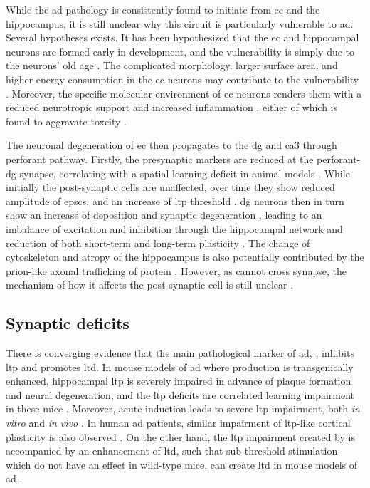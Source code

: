 While the \gls{ad} pathology is consistently found to initiate from \gls{ec} and the hippocampus, it is still unclear why this circuit is particularly vulnerable to \gls{ad}. Several hypotheses exists. It has been hypothesized that the \gls{ec} and hippocampal neurons are formed early in development, and the vulnerability is simply due to the neurons' old age \citep{rakic81}. The complicated morphology, larger surface area, and higher energy consumption in the \gls{ec} neurons may contribute to the vulnerability \citep{hevner92, buckmaster04}. Moreover, the specific molecular environment of \gls{ec} neurons renders them with a reduced neurotropic support \citep{narisawa-saito96, peterson96} and increased inflammation \citep{janelsins05, okun10}, either of which is found to aggravate \abeta{} toxcity \citep{tang08, stranahan10}.

The neuronal degeneration of \gls{ec} then propagates to the \gls{dg} and \gls{ca3} through perforant pathway. Firstly, the presynaptic markers are reduced at the perforant-\gls{dg} synapse, correlating with a spatial learning deficit in animal models \citep{smith00}. While initially the post-synaptic cells are unaffected, over time they show reduced amplitude of \glspl{epsc}, and an increase of \gls{ltp} threshold \citep{calhoun08, barnes80, barnes00}. \Gls{dg} neurons then in turn show an increase of \abeta{} deposition and synaptic degeneration \citep{reilly03, dong07}, leading to an imbalance of excitation and inhibition through the hippocampal network and reduction of both short-term and long-term plasticity \citep{palop07}. The change of cytoskeleton and atropy of the hippocampus is also potentially contributed by the prion-like axonal trafficking of \atau{} protein \citep{clavaguera09}. However, as \atau{} cannot cross synapse, the mechanism of how it affects the post-synaptic cell is still unclear \citep{stranahan10}.  

\subsection{Synaptic deficits \label{ad.synaptic}}

There is converging evidence that the main pathological marker of \gls{ad}, \abeta{}, inhibits \gls{ltp} and promotes \gls{ltd}. In mouse models of \gls{ad} where \abeta{} production is transgenically enhanced, hippocampal \gls{ltp} is severely impaired in advance of plaque formation and neural degeneration, and the \gls{ltp} deficits are correlated learning impairment in these mice \citep{hsia99, chapman99, roberson11}. Moreover, acute \abeta{} induction leads to severe \gls{ltp} impairment, both \textit{in vitro} \citep{lambert98, shankar08} and \textit{in vivo} \citep{walsh02, hu08}. In human \gls{ad} patients, similar impairment of \gls{ltp}-like cortical plasticity is also observed \citep{inghilleri06, koch12}. On the other hand, the \gls{ltp} impairment created by \abeta{} is accompanied by an enhancement of \gls{ltd}, such that sub-threshold stimulation which do not have an effect in wild-type mice, can create \gls{ltd} in mouse models of \gls{ad} \citep{hsia99, fitzjohn01, jacobsen06}. 

